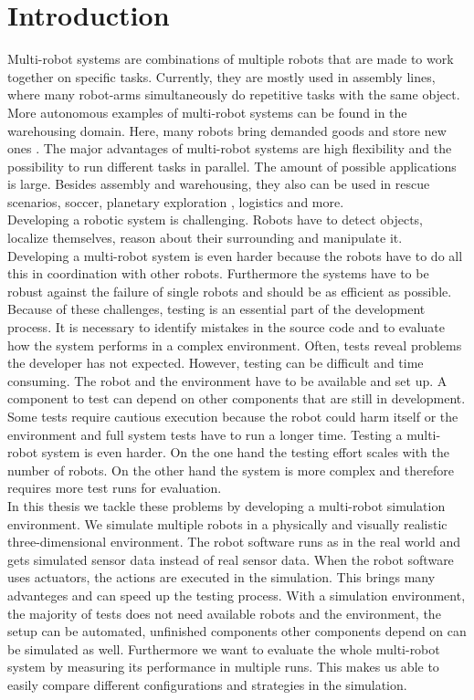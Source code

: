 \chapter{Introduction}

Multi-robot systems are combinations of multiple robots that are made to work together on specific tasks. Currently, they are mostly used in assembly lines, where many robot-arms simultaneously do repetitive tasks with the same object. More autonomous examples of multi-robot systems can be found in the warehousing domain. Here, many robots bring demanded goods and store new ones \cite{Kiva}. The major advantages of multi-robot systems are high flexibility and the possibility to run different tasks in parallel. The amount of possible applications is large. Besides assembly and warehousing, they also can be used in rescue scenarios\cite{mas_rescue}, soccer\cite{mas_soccer}, planetary exploration \cite{mas_space}, logistics and more.\\
Developing a robotic system is challenging. Robots have to detect objects, localize themselves, reason about their surrounding and manipulate it. Developing a multi-robot system is even harder because the robots have to do all this in coordination with other robots. Furthermore the systems have to be robust against the failure of single robots and should be as efficient as possible. Because of these challenges, testing is an essential part of the development process. It is necessary to identify mistakes in the source code and to evaluate how the system performs in a complex environment. Often, tests reveal problems the developer has not expected. However, testing can be difficult and time consuming. The robot and the environment have to be available and set up. A component to test can depend on other components that are still in development. Some tests require cautious execution because the robot could harm itself or the environment and full system tests have to run a longer time. Testing a multi-robot system is even harder. On the one hand the testing effort scales with the number of robots. On the other hand the system is more complex and therefore requires more test runs for evaluation.\\
In this thesis we tackle these problems by developing a multi-robot simulation environment. We simulate multiple robots in a physically and visually realistic three-dimensional environment. The robot software runs as in the real world and gets simulated sensor data instead of real sensor data. When the robot software uses actuators, the actions are executed in the simulation. This brings many advanteges and can speed up the testing process. With a simulation environment, the majority of tests does not need available robots and the environment, the setup can be automated, unfinished components other components depend on can be simulated as well. Furthermore we want to evaluate the whole multi-robot system by measuring its performance in multiple runs. This makes us able to easily compare different configurations and strategies in the simulation.\\
